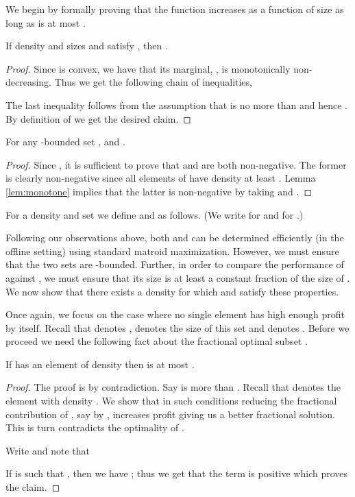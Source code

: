 We begin by formally proving that the function  increases
as a function of size  as long as  is at most
.
\begin{lemma}
  \label{lem:monotone}
  If density  and sizes  and  satisfy , then .
\end{lemma}

\begin{proof}
Since  is convex, we have that its marginal, ,
is monotonically non-decreasing. Thus we get the following chain of
inequalities,
  
The last inequality follows from the assumption that  is no more than  and hence . By
 definition of  we get the desired claim.
\end{proof}

\begin{proposition}
\label{lem:profit-lb}
For any -bounded set ,  and  .
\end{proposition}

\begin{proof}
 Since , it is
 sufficient to prove that  and  are
 both non-negative. The former is clearly non-negative since all
 elements of  have density at least . Lemma
 \ref{lem:monotone} implies that the latter is non-negative by taking
  and .
\end{proof}

\noindent
For a density  and set  we define  and  as follows. (We write  for  and  for .)
 

Following our observations above, both  and  can
be determined efficiently (in the offline setting) using standard
matroid maximization. However, we must ensure that the two sets are
-bounded. Further, in order to compare the performance of
 against , we must ensure that its size is at least
a constant fraction of the size of . We now show that there
exists a density  for which  and  satisfy
these properties.

Once again, we focus on the case where no single element has high enough profit by itself. Recall that  denotes ,  denotes the size of this set and  denotes . Before we proceed we need the following fact about the fractional
optimal subset . 

\begin{lemma}
\label{lem:opt_frac}
 If  has an element of density  then  is at most
 .
\end{lemma}
\begin{proof}
The proof is by contradiction. Say  is more than
. Recall that  denotes the element 
with density . We show that in such conditions reducing the
fractional contribution of , say by , increases profit
giving us a better fractional solution. This is turn contradicts the
optimality of .

Write  and note that

If  is such that , then we have ; thus we get that the term 
 is positive which proves the claim.
\end{proof}


